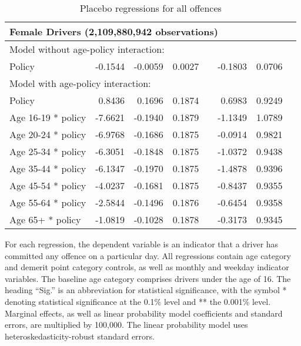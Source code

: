 \begin{table}
\begin{tabular}{l r r r l r r l}
\hline 

\multicolumn{7}{l}{\textbf{Female Drivers} (2,109,880,942  observations)} \\ 

\hline
\multicolumn{7}{l}{Model without age-policy interaction: } \\ 
Policy                   &  -0.1544       &  -0.0059        &  0.0027       &            &  -0.1803        &  0.0706       &            \\ 
\hline
\multicolumn{7}{l}{Model with age-policy interaction: } \\ 
Policy                   &  0.8436       &  0.1696        &  0.1874       &            &  0.6983        &  0.9249       &            \\ 
Age 16-19 * policy   &  -7.6621       &  -0.1940        &  0.1879       &            &  -1.1349        &  1.0789       &            \\ 
Age 20-24 * policy   &  -6.9768       &  -0.1686        &  0.1875       &            &  -0.0914        &  0.9821       &            \\ 
Age 25-34 * policy   &  -6.3051       &  -0.1848        &  0.1875       &            &  -1.0372        &  0.9438       &            \\ 
Age 35-44 * policy   &  -6.1347       &  -0.1970        &  0.1875       &            &  -1.4878        &  0.9396       &            \\ 
Age 45-54 * policy   &  -4.0237       &  -0.1681        &  0.1875       &            &  -0.8437        &  0.9355       &            \\ 
Age 55-64 * policy   &  -2.5844       &  -0.1496        &  0.1876       &            &  -0.6454        &  0.9358       &            \\ 
Age 65+ * policy   &  -1.0819       &  -0.1028        &  0.1878       &            &  -0.3173        &  0.9345       &            \\ 

\hline 

\end{tabular} 
\caption{Placebo regressions for all offences} 
For each regression, the dependent variable is an indicator that a driver has committed  
any offence on a particular day.  
All regressions contain age category and demerit point category controls, 
as well as monthly and weekday indicator variables. 
The baseline age category comprises drivers under the age of 16. 
The heading ``Sig.'' is an abbreviation for statistical significance, with 
the symbol * denoting statistical significance at the 0.1\% level 
and ** the 0.001\% level. 
% 
Marginal effects, as well as linear probability model coefficients and standard errors, are multiplied by 100,000. 
The linear probability model uses heteroskedasticity-robust standard errors. 
% 
\label{tab:seas_Logit_vs_LPMx100K_placebo_regs} 
\end{table} 
 
